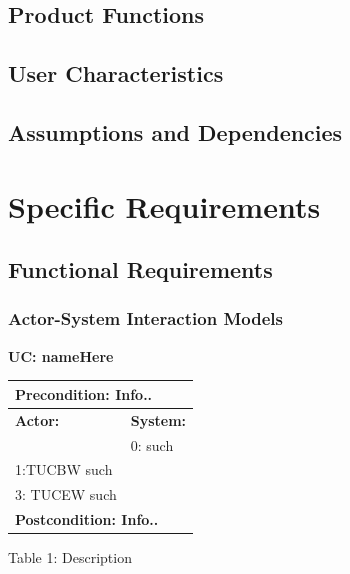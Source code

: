 \documentclass[12pt]{article}
\begin{document}
{		\subsection{Product Functions}



    	\subsection{User Characteristics}



    	\subsection{Assumptions and Dependencies}

\pagebreak

	\section{Specific Requirements}


    	\subsection{Functional Requirements}


        \subsubsection{Actor-System Interaction Models}
			{
				\noindent\textbf{UC: nameHere}
				\begin{flushleft}
					\begin{tabular}{ |p{7cm}|p{7cm}| }
   						\hline
  						\multicolumn{2}{|p{\textwidth}|}{\textbf{Precondition:} Info..} \\
 						\hline
						\textbf {Actor: } & \textbf{System: }\\
						\hline
						 & 0: such\\
						\hline
 						1:TUCBW such &\\
						\hline
						3: TUCEW such & \\
  						\hline
  						\multicolumn{2}{|p{\textwidth}|}{\textbf{Postcondition: Info..}} \\
  						 \hline

				\end{tabular}

			\end{flushleft}
			\begin{center}
    			Table 1: Description
			\end{center}

}}
\end{document}
